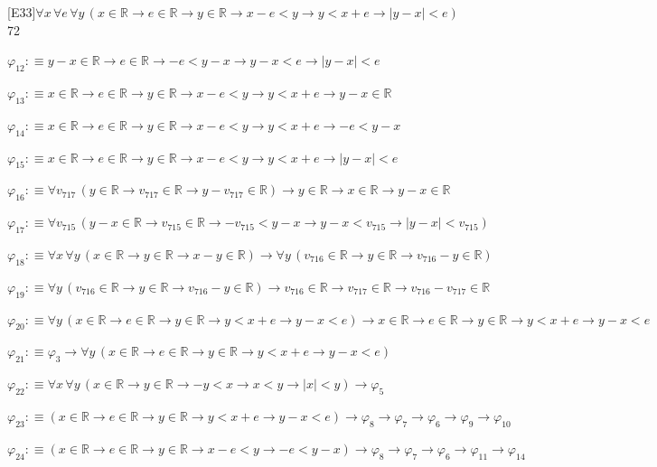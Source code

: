 \begin{fullproof}{[E33]}{$\forall x\,\forall e\,\forall y\,(x \in \mathbb{R} \to e \in \mathbb{R} \to y \in \mathbb{R} \to x - e < y \to y < x + e \to \lvert y - x \rvert < e)$}{72}
\begin{abbrevlist}
\item $\varphi_{12} :\equiv y - x \in \mathbb{R} \to e \in \mathbb{R} \to -e < y - x \to y - x < e \to \lvert y - x \rvert < e$
\item $\varphi_{13} :\equiv x \in \mathbb{R} \to e \in \mathbb{R} \to y \in \mathbb{R} \to x - e < y \to y < x + e \to y - x \in \mathbb{R}$
\item $\varphi_{14} :\equiv x \in \mathbb{R} \to e \in \mathbb{R} \to y \in \mathbb{R} \to x - e < y \to y < x + e \to -e < y - x$
\item $\varphi_{15} :\equiv x \in \mathbb{R} \to e \in \mathbb{R} \to y \in \mathbb{R} \to x - e < y \to y < x + e \to \lvert y - x \rvert < e$
\item $\varphi_{16} :\equiv \forall v_{717}\,(y \in \mathbb{R} \to v_{717} \in \mathbb{R} \to y - v_{717} \in \mathbb{R}) \to y \in \mathbb{R} \to x \in \mathbb{R} \to y - x \in \mathbb{R}$
\item $\varphi_{17} :\equiv \forall v_{715}\,(y - x \in \mathbb{R} \to v_{715} \in \mathbb{R} \to -v_{715} < y - x \to y - x < v_{715} \to \lvert y - x \rvert < v_{715})$
\item $\varphi_{18} :\equiv \forall x\,\forall y\,(x \in \mathbb{R} \to y \in \mathbb{R} \to x - y \in \mathbb{R}) \to \forall y\,(v_{716} \in \mathbb{R} \to y \in \mathbb{R} \to v_{716} - y \in \mathbb{R})$
\item $\varphi_{19} :\equiv \forall y\,(v_{716} \in \mathbb{R} \to y \in \mathbb{R} \to v_{716} - y \in \mathbb{R}) \to v_{716} \in \mathbb{R} \to v_{717} \in \mathbb{R} \to v_{716} - v_{717} \in \mathbb{R}$
\item $\varphi_{20} :\equiv \forall y\,(x \in \mathbb{R} \to e \in \mathbb{R} \to y \in \mathbb{R} \to y < x + e \to y - x < e) \to x \in \mathbb{R} \to e \in \mathbb{R} \to y \in \mathbb{R} \to y < x + e \to y - x < e$
\item $\varphi_{21} :\equiv \varphi_{3} \to \forall y\,(x \in \mathbb{R} \to e \in \mathbb{R} \to y \in \mathbb{R} \to y < x + e \to y - x < e)$
\item $\varphi_{22} :\equiv \forall x\,\forall y\,(x \in \mathbb{R} \to y \in \mathbb{R} \to -y < x \to x < y \to \lvert x \rvert < y) \to \varphi_{5}$
\item $\varphi_{23} :\equiv (x \in \mathbb{R} \to e \in \mathbb{R} \to y \in \mathbb{R} \to y < x + e \to y - x < e) \to \varphi_{8} \to \varphi_{7} \to \varphi_{6} \to \varphi_{9} \to \varphi_{10}$
\item $\varphi_{24} :\equiv (x \in \mathbb{R} \to e \in \mathbb{R} \to y \in \mathbb{R} \to x - e < y \to -e < y - x) \to \varphi_{8} \to \varphi_{7} \to \varphi_{6} \to \varphi_{11} \to \varphi_{14}$
\end{abbrevlist}
\end{fullproof}
